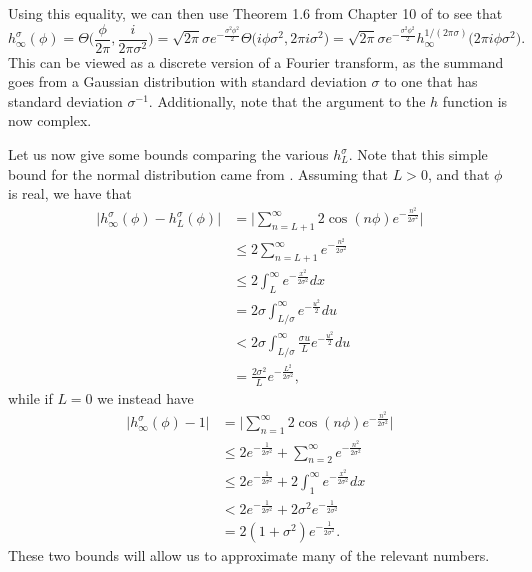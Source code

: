 \documentclass[../thesis-main/thesis-main]{subfiles}
\begin{document}
Using this equality, we can then use Theorem 1.6 from Chapter 10 of \cite{SSCA} to see that
\begin{equation}
  h_{\infty}^\sigma (\phi) = \Theta\Bigg(\frac{\phi}{2\pi}, \frac{i}{2\pi \sigma^2} \Bigg) = \sqrt{2\pi} \sigma e^{ - \frac{\sigma^2\phi^2}{2}} \Theta \big(i \phi\sigma^2, 2\pi i \sigma^2 \big) =  \sqrt{2\pi} \sigma e^{ - \frac{\sigma^2\phi^2}{2}}  h_{\infty}^{1/(2\pi \sigma)}\big(2\pi i \phi \sigma^2 \big).
  \label{eq:discrete_fourier_transform}
\end{equation}
This can be viewed as a discrete version of a Fourier transform, as the summand goes from a Gaussian distribution with standard deviation $\sigma$ to one that has standard deviation $\sigma^{-1}$.  Additionally, note that the argument to the $h$ function is now complex.

Let us now give some bounds comparing the various $h_L^\sigma$.  Note that this simple bound for the normal distribution came from \cite{Cook09}.  Assuming that $L > 0$, and that $\phi$ is real, we have that
\begin{align}
  \big|h_{\infty}^{\sigma}(\phi) - h_{L}^{\sigma}(\phi) \big| &= \Big| \sum_{n=L+1}^\infty 2 \cos (n\phi) e^{- \frac{n^2}{2\sigma^2}}\Big|\\
   &\leq 2 \sum_{n = L+1}^\infty e^{ -\frac{n^2}{2\sigma^2}}\\ 
   &\leq 2 \int_{L}^\infty e^{- \frac{x^2}{2\sigma^2}} dx\\
   &= 2 \sigma \int_{L/\sigma}^\infty e^{- \frac{u^2}{2}}{du}\\
   &< 2 \sigma \int_{L/\sigma}^\infty \frac{\sigma u}{L} e^{-\frac{u^2}{2}} du\\
   &= \frac{2 \sigma^2}{L} e^{- \frac{L^2}{2\sigma^2}}\label{eq:hL_bound},
\end{align}
while if $L = 0$ we instead have
\begin{align}
  \big|h_{\infty}^{\sigma}(\phi) - 1 \big| &= \Big| \sum_{n=1}^\infty 2 \cos (n\phi) e^{- \frac{n^2}{2\sigma^2}}\Big|\\
   &\leq 2e^{- \frac{1}{2\sigma^2}} +  \sum_{n = 2}^\infty e^{ -\frac{n^2}{2\sigma^2}}\\ 
   &\leq 2e^{- \frac{1}{2\sigma^2}} + 2 \int_{1}^\infty e^{- \frac{x^2}{2\sigma^2}} dx\\
   &< 2 e^{- \frac{1}{2\sigma^2}} +  2\sigma^2 e^{-\frac{1}{2\sigma^2}}\\
   &= 2(1+ \sigma^2) e^{-\frac{1}{2\sigma^2}}.
\end{align}
These two bounds will allow us to approximate many of the relevant numbers.  
\end{document}
